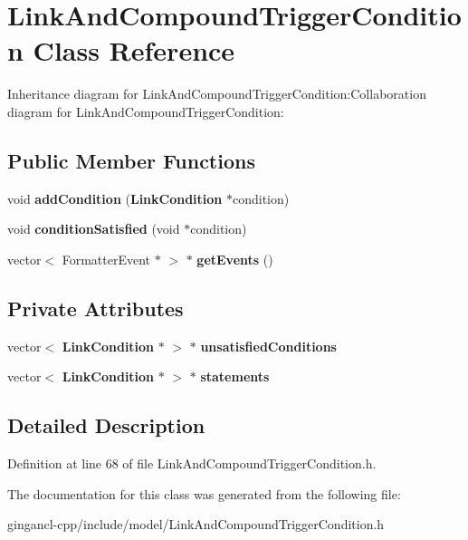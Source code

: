 \section{LinkAndCompoundTriggerCondition Class Reference}
\label{classbr_1_1pucrio_1_1telemidia_1_1ginga_1_1ncl_1_1model_1_1link_1_1LinkAndCompoundTriggerCondition}
Inheritance diagram for LinkAndCompoundTriggerCondition:Collaboration diagram for LinkAndCompoundTriggerCondition:\subsection*{Public Member Functions}
\begin{CompactItemize}
\item 
void \textbf{addCondition} ({\bf LinkCondition} $\ast$condition)\label{classbr_1_1pucrio_1_1telemidia_1_1ginga_1_1ncl_1_1model_1_1link_1_1LinkAndCompoundTriggerCondition_e5b54dcbb192d40408c1c02454c93942}

\item 
void \textbf{conditionSatisfied} (void $\ast$condition)\label{classbr_1_1pucrio_1_1telemidia_1_1ginga_1_1ncl_1_1model_1_1link_1_1LinkAndCompoundTriggerCondition_dfcc7013c6ef4b69e193394a552b381c}

\item 
vector$<$ FormatterEvent $\ast$ $>$ $\ast$ \textbf{getEvents} ()\label{classbr_1_1pucrio_1_1telemidia_1_1ginga_1_1ncl_1_1model_1_1link_1_1LinkAndCompoundTriggerCondition_fca757079125047461ec5a835b328ae7}

\end{CompactItemize}
\subsection*{Private Attributes}
\begin{CompactItemize}
\item 
vector$<$ {\bf LinkCondition} $\ast$ $>$ $\ast$ {\bf unsatisfiedConditions}\label{classbr_1_1pucrio_1_1telemidia_1_1ginga_1_1ncl_1_1model_1_1link_1_1LinkAndCompoundTriggerCondition_6a8dc0bde558089f288aa2c6f66a2f2b}

\item 
vector$<$ {\bf LinkCondition} $\ast$ $>$ $\ast$ {\bf statements}\label{classbr_1_1pucrio_1_1telemidia_1_1ginga_1_1ncl_1_1model_1_1link_1_1LinkAndCompoundTriggerCondition_e1273a3540255e6e31307cbf88426753}

\end{CompactItemize}


\subsection{Detailed Description}




Definition at line 68 of file LinkAndCompoundTriggerCondition.h.

The documentation for this class was generated from the following file:\begin{CompactItemize}
\item 
gingancl-cpp/include/model/LinkAndCompoundTriggerCondition.h\end{CompactItemize}
